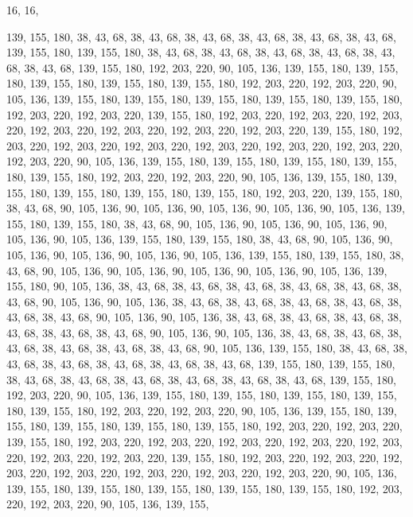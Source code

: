 16, 16,

139, 155, 180, 38, 43, 68, 38, 43, 68, 38, 43, 68, 38, 43, 68, 38,
43, 68, 38, 43, 68, 139, 155, 180, 139, 155, 180, 38, 43, 68, 38, 43,
68, 38, 43, 68, 38, 43, 68, 38, 43, 68, 38, 43, 68, 139, 155, 180,
192, 203, 220, 90, 105, 136, 139, 155, 180, 139, 155, 180, 139, 155, 180, 139,
155, 180, 139, 155, 180, 192, 203, 220, 192, 203, 220, 90, 105, 136, 139, 155,
180, 139, 155, 180, 139, 155, 180, 139, 155, 180, 139, 155, 180, 192, 203, 220,
192, 203, 220, 139, 155, 180, 192, 203, 220, 192, 203, 220, 192, 203, 220, 192,
203, 220, 192, 203, 220, 192, 203, 220, 192, 203, 220, 139, 155, 180, 192, 203,
220, 192, 203, 220, 192, 203, 220, 192, 203, 220, 192, 203, 220, 192, 203, 220,
192, 203, 220, 90, 105, 136, 139, 155, 180, 139, 155, 180, 139, 155, 180, 139,
155, 180, 139, 155, 180, 192, 203, 220, 192, 203, 220, 90, 105, 136, 139, 155,
180, 139, 155, 180, 139, 155, 180, 139, 155, 180, 139, 155, 180, 192, 203, 220,
139, 155, 180, 38, 43, 68, 90, 105, 136, 90, 105, 136, 90, 105, 136, 90,
105, 136, 90, 105, 136, 139, 155, 180, 139, 155, 180, 38, 43, 68, 90, 105,
136, 90, 105, 136, 90, 105, 136, 90, 105, 136, 90, 105, 136, 139, 155, 180,
139, 155, 180, 38, 43, 68, 90, 105, 136, 90, 105, 136, 90, 105, 136, 90,
105, 136, 90, 105, 136, 139, 155, 180, 139, 155, 180, 38, 43, 68, 90, 105,
136, 90, 105, 136, 90, 105, 136, 90, 105, 136, 90, 105, 136, 139, 155, 180,
90, 105, 136, 38, 43, 68, 38, 43, 68, 38, 43, 68, 38, 43, 68, 38,
43, 68, 38, 43, 68, 90, 105, 136, 90, 105, 136, 38, 43, 68, 38, 43,
68, 38, 43, 68, 38, 43, 68, 38, 43, 68, 38, 43, 68, 90, 105, 136,
90, 105, 136, 38, 43, 68, 38, 43, 68, 38, 43, 68, 38, 43, 68, 38,
43, 68, 38, 43, 68, 90, 105, 136, 90, 105, 136, 38, 43, 68, 38, 43,
68, 38, 43, 68, 38, 43, 68, 38, 43, 68, 38, 43, 68, 90, 105, 136,
139, 155, 180, 38, 43, 68, 38, 43, 68, 38, 43, 68, 38, 43, 68, 38,
43, 68, 38, 43, 68, 139, 155, 180, 139, 155, 180, 38, 43, 68, 38, 43,
68, 38, 43, 68, 38, 43, 68, 38, 43, 68, 38, 43, 68, 139, 155, 180,
192, 203, 220, 90, 105, 136, 139, 155, 180, 139, 155, 180, 139, 155, 180, 139,
155, 180, 139, 155, 180, 192, 203, 220, 192, 203, 220, 90, 105, 136, 139, 155,
180, 139, 155, 180, 139, 155, 180, 139, 155, 180, 139, 155, 180, 192, 203, 220,
192, 203, 220, 139, 155, 180, 192, 203, 220, 192, 203, 220, 192, 203, 220, 192,
203, 220, 192, 203, 220, 192, 203, 220, 192, 203, 220, 139, 155, 180, 192, 203,
220, 192, 203, 220, 192, 203, 220, 192, 203, 220, 192, 203, 220, 192, 203, 220,
192, 203, 220, 90, 105, 136, 139, 155, 180, 139, 155, 180, 139, 155, 180, 139,
155, 180, 139, 155, 180, 192, 203, 220, 192, 203, 220, 90, 105, 136, 139, 155,

